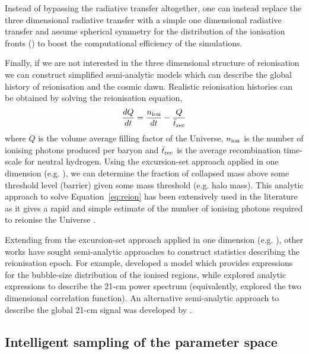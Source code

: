 Instead of bypassing the radiative transfer altogether, one can instead replace the three dimensional radiative transfer with a simple one dimensional radiative transfer and assume spherical symmetry for the distribution of the ionisation fronts (\cite{Thomas:2009,Ghara:2015}) to boost the computational efficiency of the simulations. 

Finally, if we are not interested in the three dimensional structure of reionisation we can construct simplified semi-analytic models which can describe the global history of reionisation and the cosmic dawn. Realistic reionisation histories can be obtained by solving the reionisation equation,
\begin{eqnarray} \label{eq:reion}
\frac{dQ}{dt} = \frac{n_{\rm ion}}{dt} - \frac{Q}{\bar{t}_{\rm rec}}
\end{eqnarray}
where $Q$ is the volume average filling factor of the Universe, $n_{\rm ion}$ is the number of ionising photons produced per baryon and $\bar{t}_{\rm rec}$ is the average recombination time-scale for neutral hydrogen. Using the excursion-set approach applied in one dimension (e.g. \cite{Furlanetto:2004}), we can determine the fraction of collapsed mass above some threshold level (barrier) given some mass threshold (e.g. halo mass). This analytic approach to solve Equation~\ref{eq:reion} has been extensively used in the literature as it gives a rapid and simple estimate of the number of ionising photons required to reionise the Universe \cite{Choudhury:2005,Choudhury:2006,Haardt:2012,Kuhlen:2012,Bouwens:2015,Mitra:2015,Robertson:2015,Khaire:2016,Madau:2017,Mitra:2018,Finkelstein:2019,Mason:2019,Naidu:2019}.

Extending from the excursion-set approach applied in one dimension (e.g. \cite{Furlanetto:2004}), other works have sought semi-analytic approaches to construct statistics describing the reionisation epoch. For example, \cite{Paranjape:2014} developed a model which provides expressions for the bubble-size distribution of the ionised regions, while \cite{McQuinn:2005,McQuinn:2006} explored analytic expressions to describe the 21-cm power spectrum (equivalently, \cite{Barkana:2007} explored the two dimensional correlation function). An alternative semi-analytic approach to describe the global 21-cm signal was developed by \cite{Mirocha:2014,Mirocha:2017,Mirocha:2018}.

\subsection{Intelligent sampling of the parameter space} \label{sec:intel_samp}

